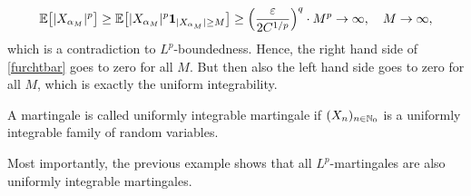 \begin{example}
\begin{enumerate}[label=(\roman*)]
			\begin{align*}
				\mathbb{E}\big[\lvert X_{\alpha_M}\rvert^p \big] \geq  \mathbb{E} \big[ \lvert X_{\alpha_M}\rvert^p \mathbf 1_{\lvert X_{\alpha_M}\rvert \geq M}\big] \geq \Big(\frac{\varepsilon}{2 C^{1/p}}\Big)^q \cdot M^p \to \infty, \quad M \to \infty,
			\end{align*}
			which is a contradiction to $L^p$-boundedness. Hence, the right hand side of \eqref{furchtbar} goes to zero for all $M$. But then also the left hand side goes to zero for all $M$, which is exactly the uniform integrability.
	\end{enumerate}
\end{example}
\begin{ldef}
\begin{deff}
	A martingale is called uniformly integrable martingale if $(X_n)_{n\in\mathbb{N}_0}$ is a uniformly integrable family of random variables.
\end{deff}
\end{ldef}
Most importantly, the previous example shows that all $L^p$-martingales are also uniformly integrable martingales.\smallskip

